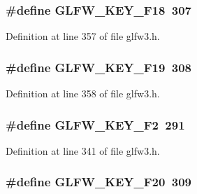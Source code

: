 \subsubsection[{G\+L\+F\+W\+\_\+\+K\+E\+Y\+\_\+\+F18}]{\setlength{\rightskip}{0pt plus 5cm}\#define G\+L\+F\+W\+\_\+\+K\+E\+Y\+\_\+\+F18~307}\label{group__keys_gaebf6391058d5566601e357edc5ea737c}


Definition at line 357 of file glfw3.\+h.

\hypertarget{group__keys_gaec011d9ba044058cb54529da710e9791}{}
\subsubsection[{G\+L\+F\+W\+\_\+\+K\+E\+Y\+\_\+\+F19}]{\setlength{\rightskip}{0pt plus 5cm}\#define G\+L\+F\+W\+\_\+\+K\+E\+Y\+\_\+\+F19~308}\label{group__keys_gaec011d9ba044058cb54529da710e9791}


Definition at line 358 of file glfw3.\+h.

\hypertarget{group__keys_ga0900750aff94889b940f5e428c07daee}{}
\subsubsection[{G\+L\+F\+W\+\_\+\+K\+E\+Y\+\_\+\+F2}]{\setlength{\rightskip}{0pt plus 5cm}\#define G\+L\+F\+W\+\_\+\+K\+E\+Y\+\_\+\+F2~291}\label{group__keys_ga0900750aff94889b940f5e428c07daee}


Definition at line 341 of file glfw3.\+h.

\hypertarget{group__keys_ga82b9c721ada04cd5ca8de767da38022f}{}
\subsubsection[{G\+L\+F\+W\+\_\+\+K\+E\+Y\+\_\+\+F20}]{\setlength{\rightskip}{0pt plus 5cm}\#define G\+L\+F\+W\+\_\+\+K\+E\+Y\+\_\+\+F20~309}\label{group__keys_ga82b9c721ada04cd5ca8de767da38022f}



